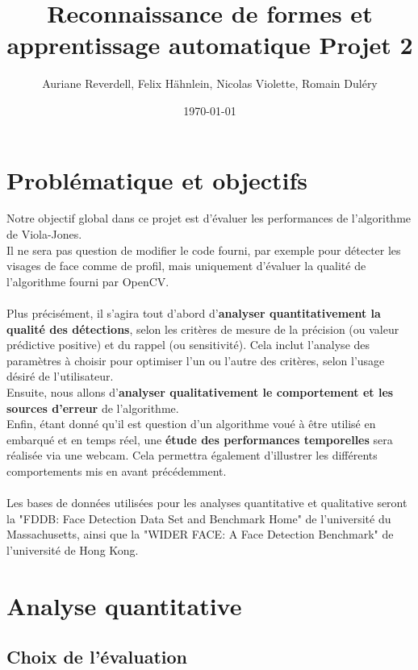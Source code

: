 \documentclass[a4paper,11pt]{article}
\title{Reconnaissance de formes et apprentissage automatique Projet 2}
\author{Auriane Reverdell, Felix Hähnlein, Nicolas Violette, Romain Duléry}
\date{\today}
\begin{document}
\maketitle
\vspace{1cm}

\section{Problématique et objectifs}

    Notre objectif global dans ce projet est d'évaluer les performances de l'algorithme de Viola-Jones.\\
    Il ne sera pas question de modifier le code fourni, par exemple pour détecter les visages de face comme de profil, mais uniquement d'évaluer la qualité de l'algorithme fourni par OpenCV.\\\\
    Plus précisément, il s'agira tout d'abord d'\textbf{analyser quantitativement la qualité des détections}, selon les critères de mesure de la précision (ou valeur prédictive positive) et du rappel (ou sensitivité). Cela inclut l'analyse des paramètres à choisir pour optimiser l'un ou l'autre des critères, selon l'usage désiré de l'utilisateur.\\
    Ensuite, nous allons d'\textbf{analyser qualitativement le comportement et les sources d'erreur} de l'algorithme.\\
    Enfin, étant donné qu'il est question d'un algorithme voué à être utilisé en embarqué et en temps réel, une \textbf{étude des performances temporelles} sera réalisée via une webcam. Cela permettra également d'illustrer les différents comportements mis en avant précédemment.\\\\
    Les bases de données utilisées pour les analyses quantitative et qualitative seront la "FDDB: Face Detection Data Set and Benchmark Home" de l'université du Massachusetts, ainsi que la "WIDER FACE: A Face Detection Benchmark" de l'université de Hong Kong. 

\section{Analyse quantitative}
    
    \subsection{Choix de l'évaluation}
        
\end{document}
